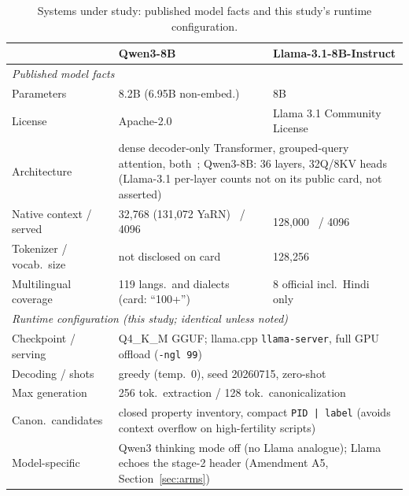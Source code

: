 \documentclass{llncs}
\begin{document}
\begin{table}[t]
\centering
\caption{Systems under study: published model facts and this study's runtime
configuration.}
\label{tab:params}
\footnotesize
{\renewcommand{\arraystretch}{1.0}\setlength{\tabcolsep}{4pt}%
  \sloppy
\begin{tabular}{p{3.6cm}p{3.85cm}p{3.9cm}}
\toprule
 & Qwen3-8B & Llama-3.1-8B-Instruct \\
\midrule
\multicolumn{3}{l}{\emph{Published model facts}} \\[3pt]
Parameters & 8.2B (6.95B non-embed.) & 8B \\
License & Apache-2.0 & Llama 3.1 Community License \\
Architecture & \multicolumn{2}{p{8.3cm}}{dense decoder-only Transformer, grouped-query attention, both~\cite{yang2025qwen3,grattafiori2024llama3}; Qwen3-8B: 36 layers, 32Q/8KV heads~\cite{yang2025qwen3} (Llama-3.1 per-layer counts not on its public card, not asserted)} \\
Native context / served & 32{,}768 (131{,}072 YaRN)~\cite{yang2025qwen3} / 4096 & 128{,}000~\cite{grattafiori2024llama3} / 4096 \\
Tokenizer / vocab.\ size & not disclosed on card & 128{,}256~\cite{grattafiori2024llama3} \\
Multilingual coverage & 119 langs.\ and dialects~\cite{yang2025qwen3} (card: ``100+'') & 8 official incl.\ Hindi only~\cite{grattafiori2024llama3} \\[3pt]
\midrule
\multicolumn{3}{l}{\emph{Runtime configuration (this study; identical unless noted)}} \\[3pt]
Checkpoint / serving & \multicolumn{2}{p{8.3cm}}{Q4\_K\_M GGUF; llama.cpp \texttt{llama-server}, full GPU offload (\texttt{-ngl 99})} \\
Decoding / shots & \multicolumn{2}{p{8.3cm}}{greedy (temp.\ 0), seed 20260715, zero-shot} \\
Max generation & \multicolumn{2}{p{8.3cm}}{256 tok.\ extraction / 128 tok.\ canonicalization} \\
Canon.\ candidates & \multicolumn{2}{p{8.3cm}}{closed property inventory, compact \texttt{PID~|~label} (avoids context overflow on high-fertility scripts)} \\
Model-specific & \multicolumn{2}{p{8.3cm}}{Qwen3 thinking mode off (no Llama analogue); Llama echoes the stage-2 header (Amendment A5, Section~\ref{sec:arms})} \\
\bottomrule
\end{tabular}
}
\end{table}
\end{document}
